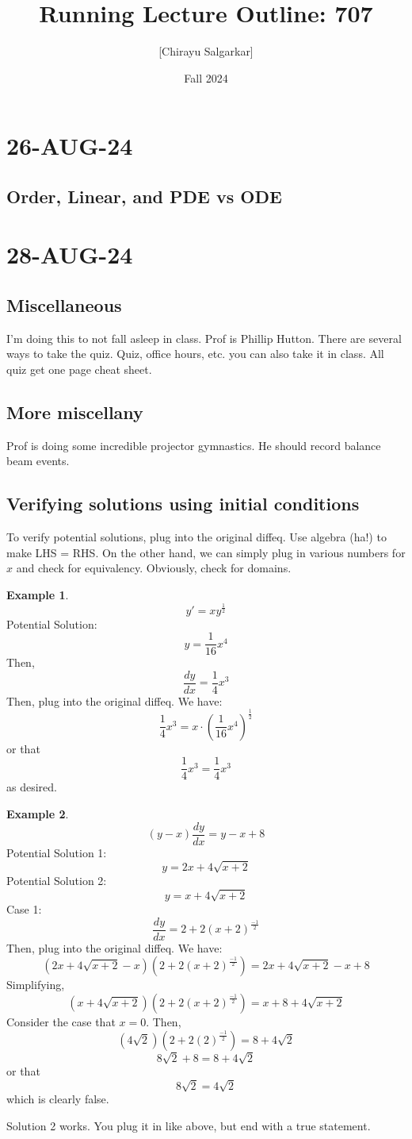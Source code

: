 \documentclass{article}
\title{Running Lecture Outline: 707}
\author{[Chirayu Salgarkar]}
\date{Fall 2024}
\theoremstyle{definition}
\newtheorem{example}{Example}[section]
\begin{document}
\maketitle
\tableofcontents

\vspace{.25in}
\section{26-AUG-24}
\subsection{Order, Linear, and PDE vs ODE}
\section{28-AUG-24}

\subsection{Miscellaneous}
I'm doing this to not fall asleep in class. Prof is Phillip Hutton. There are several ways to take the quiz. Quiz, office hours, etc. you can also take it in class. All quiz get one page cheat sheet. 

\subsection{More miscellany}
Prof is doing some incredible projector gymnastics. He should record balance beam events.
\subsection{Verifying solutions using initial conditions}
To verify potential solutions, plug into the original diffeq. Use algebra (ha!) to make LHS = RHS. On the other hand, we can simply plug in various numbers for $x$ and check for equivalency. Obviously, check for domains. 
\begin{example}
   \[ y' = xy^{\frac{1}{2}}\]
Potential Solution: \[y = \frac{1}{16}x^4\]
Then, 
    \[\frac{dy}{dx} = \frac{1}{4}x^3 \]
Then, plug into the original diffeq. We have:
    \[ \frac{1}{4}x^3 = x \cdot (\frac{1}{16}x^4)^{\frac{1}{2}}\]
or that
    \[\frac{1}{4}x^3 = \frac{1}{4}x^3 \]
as desired. 
\end{example}

\begin{example}
    \[ (y-x)\frac{dy}{dx} = y-x+8\]
     Potential Solution 1: \[y = 2x + 4\sqrt{x+2}\]
    Potential Solution 2: \[y = x + 4\sqrt{x+2}\]
    Case 1:
     \[\frac{dy}{dx} = 2 + 2(x+2)^{\frac{-1}{2}} \]
     Then, plug into the original diffeq. We have:
     \[ (2x + 4\sqrt{x+2} - x)(2 + 2(x+2)^{\frac{-1}{2}}) = 2x + 4\sqrt{x+2} -x+8\]
     Simplifying,
    \[ (x + 4\sqrt{x+2})(2 + 2(x+2)^{\frac{-1}{2}}) = x+8 + 4\sqrt{x+2}\]
    Consider the case that $x=0$. Then,
    \[ (4\sqrt{2})(2 + 2(2)^{\frac{-1}{2}}) = 8 + 4\sqrt{2}\]
    \[8\sqrt{2} + 8 = 8 + 4\sqrt{2} \] 
    or that 
    \[8\sqrt{2} = 4\sqrt{2}\] 
 which is clearly false. 

 Solution 2 works. You plug it in like above, but end with a true statement. 
 \end{example}
\end{document}
